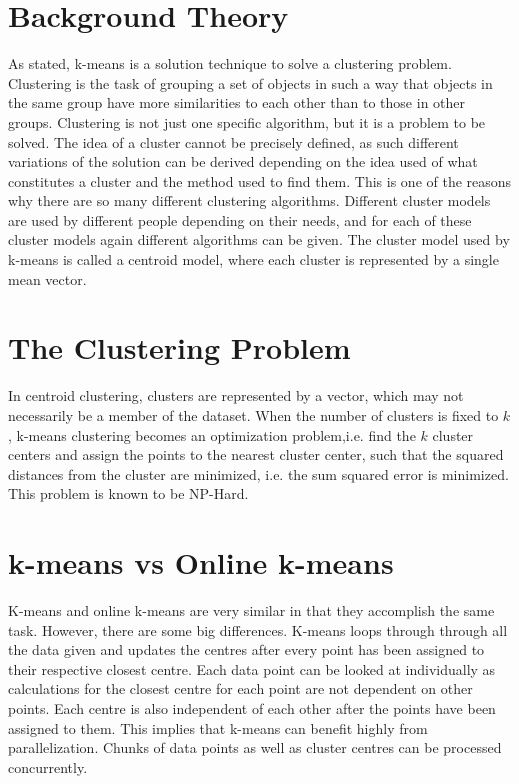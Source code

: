 \documentclass{article}
\begin{document}
\section{Background Theory}
As stated, k-means is a solution technique to solve a clustering problem. Clustering is the task of grouping a set of objects in such a way that objects in the same group have more similarities to each other than to those in other groups. Clustering is not just one specific algorithm, but it is a problem to be solved. The idea of a cluster cannot be precisely defined, as such different variations of the solution can be derived depending on the idea used of what constitutes a cluster and the method used to find them. This is one of the reasons why there are so many different clustering algorithms. Different cluster models are used by different people depending on their needs, and for each of these cluster models again different algorithms can be given. The cluster model used by k-means is called a centroid model, where each cluster is represented by a single mean vector.

\section{The Clustering Problem}
In centroid clustering, clusters are represented by a vector, which may not necessarily be a member of the dataset. When the number of clusters is fixed to $k$, k-means clustering becomes an optimization problem,i.e. find the $k$ cluster centers and assign the points to the nearest cluster center, such that the squared distances from the cluster are minimized, i.e. the sum squared error is minimized. This problem is known to be NP-Hard.


\section{k-means vs Online k-means}
K-means and online k-means are very similar in that they accomplish the same task. However, there are some big differences. K-means loops through through all the data given and updates the centres after every point has been assigned to their respective closest centre. Each data point can be looked at individually as calculations for the closest centre for each point are not dependent on other points. Each centre is also independent of each other after the points have been assigned to them. This implies that k-means can benefit highly from parallelization. Chunks of data points as well as cluster centres can be processed concurrently.
\end{document}
